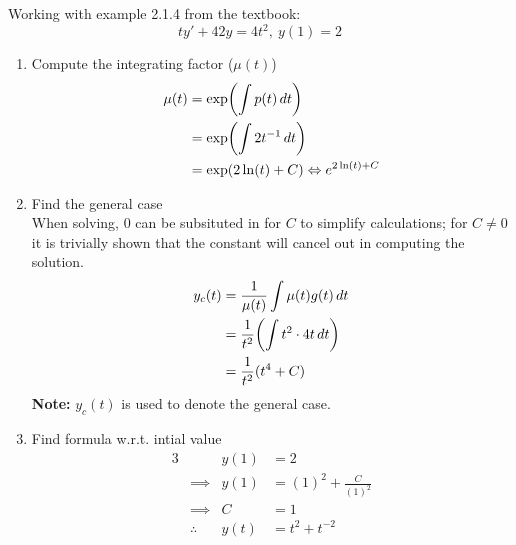 \documentclass[diffeq.tex]{subfiles}
\begin{document}
    \begin{example}
        Working with example 2.1.4 from the textbook:
        \begin{equation}
            ty' +4 2y = 4 t^{2},\ y(1) = 2
        \end{equation}
        \begin{enumerate}
            \item Compute the integrating factor ($\mu(t)$)
                \begin{align}
                    \mu(t) &= \exp\bbbp{\int p(t)\,dt}\\
                    &= \exp\bbbp{\int 2 t^{-1}\,dt}\\
                    &= \exp\bp{2\ln(t) + C} \Leftrightarrow e^{2\ln(t) + C}
                \end{align}
            \item Find the general case\\
                When solving, $0$ can be subsituted in for $C$ to simplify calculations; for $C \neq 0$ it is trivially shown that the constant will cancel out in computing the solution.
                \begin{align}
                    y_c(t) &= \frac{1}{\mu(t)}\int \mu(t)g(t)\,dt\\
                    &= \frac{1}{t^{2}}\bbbp{\int t^{2}\cdot 4t\,dt}\\
                    &= \frac{1}{t^{2}}(t^{4} + C)
                \end{align}
                \textbf{Note:} $y_c(t)$ is used to denote the general case.
            \item Find formula w.r.t. intial value
                \begin{alignat}{3}
                    &&y(1) &= 2\\
                    &\implies &y(1) &= (1)^{2} + \frac{C}{(1)^{2}}\\
                    &\implies &C &= 1\\
                    &\therefore &y(t) &= t^{2} + t^{-2}
                \end{alignat}
        \end{enumerate}
    \end{example}
\end{document}
